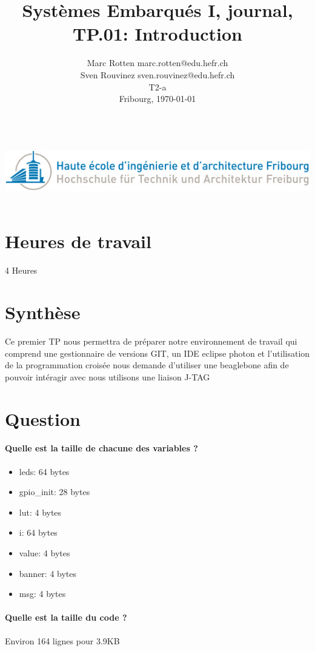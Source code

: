 \documentclass[a4paper]{article}
\author{Marc Rotten marc.rotten@edu.hefr.ch \\ Sven Rouvinez sven.rouvinez@edu.hefr.ch \\ T2-a \\ Fribourg, \today }
\title{Systèmes Embarqués I, journal, TP.01: Introduction}
\makeatletter
\renewcommand{\maketitle}{
\begin{center}
\vspace{2ex}
{\huge \textsc{\@title}}
\vspace{1ex}
\\
\includegraphics[width=.8\textwidth]{logo.png}
\\
\vspace{4ex}
\@author \\
   \vspace{40em}
\newpage
\end{center}
}
\makeatother
\begin{document}
\maketitle
\pagestyle{fancy}
\makeatletter
\let\runauthor\@author
\let\runtitle\@title
\makeatother
\lhead{\runtitle}
\rhead{\today}
\cfoot{\thepage}


\section{Heures de travail}
4 Heures

\section{Synthèse}
Ce premier TP nous permettra de préparer notre environnement de travail qui comprend une gestionnaire de versions GIT, un IDE eclipse photon et l'utilisation de la programmation croisée nous demande d'utiliser une beaglebone afin de pouvoir intéragir avec nous utilisons une liaison J-TAG

\section{Question}
\paragraph{Quelle est la taille de chacune des variables ?}
\begin{itemize}
   \item leds: 64 bytes
   \item gpio\_init: 28 bytes
   \item lut: 4 bytes
   \item i: 64 bytes
   \item value: 4 bytes
   \item banner: 4 bytes
   \item msg: 4 bytes
\end{itemize}

\paragraph{Quelle est la taille du code ?}
Environ 164 lignes pour 3.9KB
\end{document}
